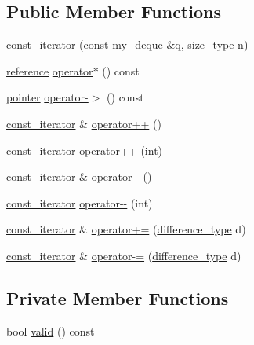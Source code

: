 \subsection*{Public Member Functions}
\begin{DoxyCompactItemize}
\item 
\hyperlink{classmy__deque_1_1const__iterator_a119d25762ab3d52a3a81d30870bd9c02}{const\-\_\-iterator} (const \hyperlink{classmy__deque}{my\-\_\-deque} \&q, \hyperlink{classmy__deque_a61e5e5317fe72a381ce4d45f09544b02}{size\-\_\-type} n)
\item 
\hyperlink{classmy__deque_1_1const__iterator_a37cd7eef8e73e5a65d7a9d16ba6d3ed2}{reference} \hyperlink{classmy__deque_1_1const__iterator_a14715989004b54dc6a1bcd3d2ac78a20}{operator$\ast$} () const 
\item 
\hyperlink{classmy__deque_1_1const__iterator_a6a7d42610f3b7e55f38897c151862071}{pointer} \hyperlink{classmy__deque_1_1const__iterator_aef7e08cfcebb0c0932422f420645e1ce}{operator-\/$>$} () const 
\item 
\hyperlink{classmy__deque_1_1const__iterator}{const\-\_\-iterator} \& \hyperlink{classmy__deque_1_1const__iterator_a8bc45a394bb73728fca1ebf90755d662}{operator++} ()
\item 
\hyperlink{classmy__deque_1_1const__iterator}{const\-\_\-iterator} \hyperlink{classmy__deque_1_1const__iterator_adf9ea902391ac993088e7c969c64e4de}{operator++} (int)
\item 
\hyperlink{classmy__deque_1_1const__iterator}{const\-\_\-iterator} \& \hyperlink{classmy__deque_1_1const__iterator_ae5dffda4ac0a8ad59a4954dcdeeb5f98}{operator-\/-\/} ()
\item 
\hyperlink{classmy__deque_1_1const__iterator}{const\-\_\-iterator} \hyperlink{classmy__deque_1_1const__iterator_a83c405a1e0b9672c074aaa933a7127df}{operator-\/-\/} (int)
\item 
\hyperlink{classmy__deque_1_1const__iterator}{const\-\_\-iterator} \& \hyperlink{classmy__deque_1_1const__iterator_a2bbc121cc446855edcb9d20451cae024}{operator+=} (\hyperlink{classmy__deque_1_1const__iterator_abe3b655aa980c8a12ba486058464c91d}{difference\-\_\-type} d)
\item 
\hyperlink{classmy__deque_1_1const__iterator}{const\-\_\-iterator} \& \hyperlink{classmy__deque_1_1const__iterator_ab51576a76fd33fd55be87ca4c467dc96}{operator-\/=} (\hyperlink{classmy__deque_1_1const__iterator_abe3b655aa980c8a12ba486058464c91d}{difference\-\_\-type} d)
\end{DoxyCompactItemize}
\subsection*{Private Member Functions}
\begin{DoxyCompactItemize}
\item 
bool \hyperlink{classmy__deque_1_1const__iterator_ab233485f07a0be8dbc1b41987cc1af42}{valid} () const 
\end{DoxyCompactItemize}

